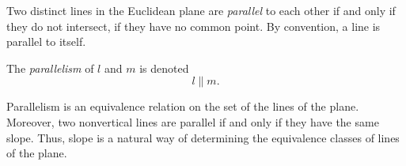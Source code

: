 \documentclass[12pt]{article}
\theoremstyle{definition}
\begin{document}
Two distinct lines in the Euclidean plane are {\em parallel} to each other if and only if they do not intersect,  if they have no common point.  By convention, a line is parallel to itself.

The {\em parallelism} of $l$ and $m$ is denoted 
$$l \parallel m.$$

Parallelism is an equivalence relation on the set of the lines of the plane.  Moreover, two nonvertical lines are parallel if and only if  they have the same slope.  Thus, slope is a natural way of determining the equivalence classes of lines of the plane.
\end{document}
